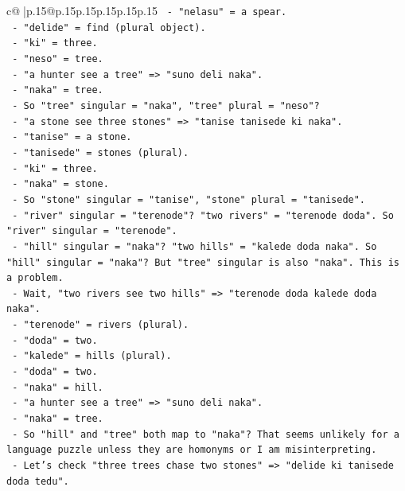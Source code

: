 \documentclass{article}
\begin{document}
{\begin{supertabular}{c@{$\;$}|p{.15\linewidth}@{}p{.15\linewidth}p{.15\linewidth}p{.15\linewidth}p{.15\linewidth}p{.15\linewidth}}
{{{\texttt{       {-} "nelasu" = a spear.} \\
\texttt{       {-} "delide" = find (plural object).} \\
\texttt{       {-} "ki" = three.} \\
\texttt{       {-} "neso" = tree.} \\
\texttt{     {-} "a hunter see a tree" => "suno deli naka".} \\
\texttt{       {-} "naka" = tree.} \\
\texttt{     {-} So "tree" singular = "naka", "tree" plural = "neso"?} \\
\texttt{     {-} "a stone see three stones" => "tanise tanisede ki naka".} \\
\texttt{       {-} "tanise" = a stone.} \\
\texttt{       {-} "tanisede" = stones (plural).} \\
\texttt{       {-} "ki" = three.} \\
\texttt{       {-} "naka" = stone.} \\
\texttt{     {-} So "stone" singular = "tanise", "stone" plural = "tanisede".} \\
\texttt{     {-} "river" singular = "terenode"? "two rivers" = "terenode doda". So "river" singular = "terenode".} \\
\texttt{     {-} "hill" singular = "naka"? "two hills" = "kalede doda naka". So "hill" singular = "naka"? But "tree" singular is also "naka". This is a problem.} \\
\texttt{     {-} Wait, "two rivers see two hills" => "terenode doda kalede doda naka".} \\
\texttt{       {-} "terenode" = rivers (plural).} \\
\texttt{       {-} "doda" = two.} \\
\texttt{       {-} "kalede" = hills (plural).} \\
\texttt{       {-} "doda" = two.} \\
\texttt{       {-} "naka" = hill.} \\
\texttt{     {-} "a hunter see a tree" => "suno deli naka".} \\
\texttt{       {-} "naka" = tree.} \\
\texttt{     {-} So "hill" and "tree" both map to "naka"? That seems unlikely for a language puzzle unless they are homonyms or I am misinterpreting.} \\
\texttt{     {-} Let's check "three trees chase two stones" => "delide ki tanisede doda tedu".} \\
}}}
\end{supertabular}}
\end{document}
